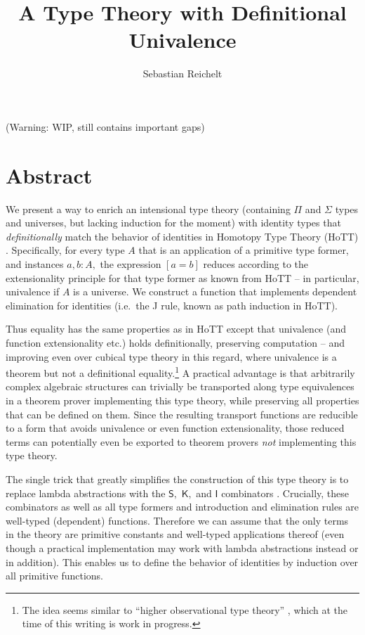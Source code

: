 \documentclass[a4paper]{article}
\title{A Type Theory with Definitional Univalence}
\author{Sebastian Reichelt}
\theoremstyle{definition}
\theoremstyle{remark}
\newcommand{\0}{\primType{0}}
\newcommand{\1}{\primType{1}}
\newcommand{\2}{\primType{2}}
\newcommand{\nm}{\mathsf}
\newcommand{\combinator}{\nm}
\newcommand{\idFun}{\combinator{I}}
\newcommand{\constFun}{\combinator{K}}
\newcommand{\revSubstFun}{\combinator{S}}
\begin{document}
\maketitle

(Warning: WIP, still contains important gaps)

\section{Abstract}

We present a way to enrich an intensional type theory (containing $\Pi$ and $\Sigma$ types and
universes, but lacking induction for the moment) with identity types that \emph{definitionally}
match the behavior of identities in Homotopy Type Theory (HoTT) \cite{hottbook}.
Specifically, for every type $A$ that is an application of a primitive type former, and instances
$a,b : A,$ the expression $[a = b]$ reduces according to the extensionality principle for that type
former as known from HoTT -- in particular, univalence if $A$ is a universe. We construct a function
that implements dependent elimination for identities (i.e.\ the J rule, known as path induction in
HoTT).

Thus equality has the same properties as in HoTT except that univalence (and function
extensionality etc.) holds definitionally, preserving computation -- and improving even over cubical
type theory \cite{cubical} in this regard, where univalence is a theorem but not a definitional
equality.\footnote{The idea seems similar to ``higher observational type theory'' \cite{higher-ott},
which at the time of this writing is work in progress.}
A practical advantage is that arbitrarily complex algebraic structures can trivially be transported
along type equivalences in a theorem prover implementing this type theory, while preserving all
properties that can be defined on them. Since the resulting transport functions are reducible to a
form that avoids univalence or even function extensionality, those reduced terms can potentially
even be exported to theorem provers \emph{not} implementing this type theory.

The single trick that greatly simplifies the construction of this type theory is to replace lambda
abstractions with the $\revSubstFun,$ $\constFun,$ and $\idFun$ combinators \cite{combinators}.
Crucially, these combinators as well as all type formers and introduction and elimination rules are
well-typed (dependent) functions. Therefore we can assume that the only terms in the theory are
primitive constants and well-typed applications thereof (even though a practical implementation may
work with lambda abstractions instead or in addition). This enables us to define the behavior of
identities by induction over all primitive functions.
\end{document}
